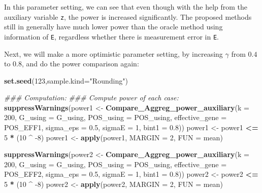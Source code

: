 \documentclass[
]{article}
\newenvironment{Shaded}{\begin{snugshade}}{\end{snugshade}}
\newcommand{\CommentTok}[1]{\textcolor[rgb]{0.56,0.35,0.01}{\textit{#1}}}
\newcommand{\DataTypeTok}[1]{\textcolor[rgb]{0.13,0.29,0.53}{#1}}
\newcommand{\DecValTok}[1]{\textcolor[rgb]{0.00,0.00,0.81}{#1}}
\newcommand{\FloatTok}[1]{\textcolor[rgb]{0.00,0.00,0.81}{#1}}
\newcommand{\KeywordTok}[1]{\textcolor[rgb]{0.13,0.29,0.53}{\textbf{#1}}}
\newcommand{\NormalTok}[1]{#1}
\newcommand{\OperatorTok}[1]{\textcolor[rgb]{0.81,0.36,0.00}{\textbf{#1}}}
\newcommand{\StringTok}[1]{\textcolor[rgb]{0.31,0.60,0.02}{#1}}
\begin{document}
In this parameter setting, we can see that even though with the help
from the auxiliary variable \texttt{z}, the power is increased
significantly. The proposed methods still in generally have much lower
power than the oracle method using information of \texttt{E}, regardless
whether there is measurement error in \texttt{E}.

Next, we will make a more optimistic parameter setting, by increasing
\(\gamma\) from \(0.4\) to \(0.8\), and do the power comparison again:

\begin{Shaded}
\begin{Highlighting}[]
\KeywordTok{set.seed}\NormalTok{(}\DecValTok{123}\NormalTok{,}\DataTypeTok{sample.kind=}\StringTok{"Rounding"}\NormalTok{)}

\CommentTok{### Computation:}
\CommentTok{### Compute power of each case:}
\KeywordTok{suppressWarnings}\NormalTok{(power1 <-}\StringTok{ }\KeywordTok{Compare_Aggreg_power_auxiliary}\NormalTok{(}\DataTypeTok{k =} \DecValTok{200}\NormalTok{, }\DataTypeTok{G_using =}\NormalTok{ G_using, }\DataTypeTok{POS_using =}\NormalTok{ POS_using, }\DataTypeTok{effective_gene =}\NormalTok{ POS_EFF1, }\DataTypeTok{sigma_eps =} \FloatTok{0.5}\NormalTok{, }\DataTypeTok{sigmaE =} \DecValTok{1}\NormalTok{, }\DataTypeTok{bint1 =} \FloatTok{0.8}\NormalTok{))}
\NormalTok{power1 <-}\StringTok{ }\NormalTok{power1 }\OperatorTok{<=}\StringTok{ }\DecValTok{5} \OperatorTok{*}\StringTok{ }\NormalTok{(}\DecValTok{10} \OperatorTok{^}\StringTok{ }\DecValTok{-8}\NormalTok{)}
\NormalTok{power1 <-}\StringTok{ }\KeywordTok{apply}\NormalTok{(power1, }\DataTypeTok{MARGIN =} \DecValTok{2}\NormalTok{, }\DataTypeTok{FUN =}\NormalTok{ mean)}

\KeywordTok{suppressWarnings}\NormalTok{(power2 <-}\StringTok{ }\KeywordTok{Compare_Aggreg_power_auxiliary}\NormalTok{(}\DataTypeTok{k =} \DecValTok{200}\NormalTok{, }\DataTypeTok{G_using =}\NormalTok{ G_using, }\DataTypeTok{POS_using =}\NormalTok{ POS_using, }\DataTypeTok{effective_gene =}\NormalTok{ POS_EFF2, }\DataTypeTok{sigma_eps =} \FloatTok{0.5}\NormalTok{, }\DataTypeTok{sigmaE =} \DecValTok{1}\NormalTok{, }\DataTypeTok{bint1 =} \FloatTok{0.8}\NormalTok{))}
\NormalTok{power2 <-}\StringTok{ }\NormalTok{power2 }\OperatorTok{<=}\StringTok{ }\DecValTok{5} \OperatorTok{*}\StringTok{ }\NormalTok{(}\DecValTok{10} \OperatorTok{^}\StringTok{ }\DecValTok{-8}\NormalTok{)}
\NormalTok{power2 <-}\StringTok{ }\KeywordTok{apply}\NormalTok{(power2, }\DataTypeTok{MARGIN =} \DecValTok{2}\NormalTok{, }\DataTypeTok{FUN =}\NormalTok{ mean)}


\end{Highlighting}
\end{Shaded}
\end{document}
